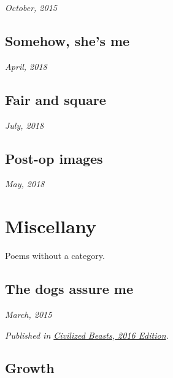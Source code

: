 \documentclass[10pt]{memoir}
\begin{document}
  \hfill\textit{October, 2015}

  
  \newpage


  \section{Somehow, she's me}

  \hfill\textit{April, 2018}

  
  \newpage


  \section{Fair and square}

  \hfill\textit{July, 2018}

  
  \newpage


  \section{Post-op images}

  \hfill\textit{May, 2018}

  
  \newpage


  \chapter{Miscellany}

  Poems without a category.
  \thispagestyle{empty}
  \newpage


  \section{The dogs assure me}

  \hfill\textit{March, 2015}

  

  \textit{Published in \underline{Civilized Beasts, 2016 Edition}.}
  \cleartoverso


  \section{Growth}
\end{document}

